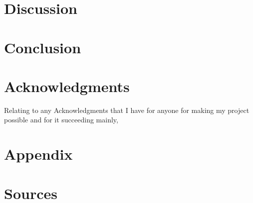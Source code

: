 \documentclass[]{article}
\begin{document}
\section{Discussion}

\section{Conclusion}

\section{Acknowledgments}
Relating to any Acknowledgments that I have for anyone for making my project possible and for it succeeding mainly,  
\section{Appendix}

\section{Sources}
\end{document}
